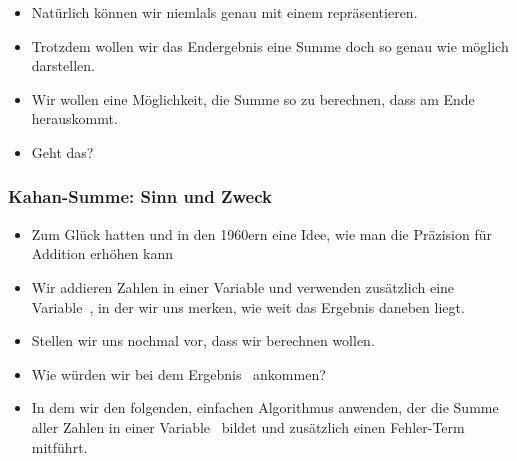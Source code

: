 \documentclass[aspectratio=169,mathserif,notheorems]{beamer}%
\begin{document}
\begin{frame}[t]
{{\begin{itemize}
{}%
%
%
%
%
%
%
%
\item<32-> Natürlich können wir  niemlals genau mit einem  repräsentieren.%
%
\item<33-> Trotzdem wollen wir das Endergebnis eine Summe doch so genau wie möglich darstellen.%
%
\item<34-> Wir wollen eine Möglichkeit, die Summe  so zu berechnen, dass am Ende  herauskommt.%
%
\item<35-> Geht das?%
\end{itemize}%
}}%
%
%
%
\end{frame}%
%
\begin{frame}%
\frametitle{Kahan-Summe: Sinn und Zweck}%
\begin{itemize}%
%
\item Zum Glück hatten \citeauthor{K1965PFRORTE} und \citeauthor{B1968NSIMA} in den 1960ern eine Idee, wie man die Präzision für Addition erhöhen kann%
%
\item<2-> Wir addieren Zahlen in einer Variable  und verwenden zusätzlich eine Variable~, in der wir uns merken, wie weit das Ergebnis daneben liegt.%
%
\item<3-> Stellen wir uns nochmal vor, dass wir  berechnen wollen.%
%
\item<4-> Wie würden wir bei dem Ergebnis~ ankommen?
%
\item<5-> In dem wir den folgenden, einfachen Algorithmus anwenden, der die Summe aller Zahlen in einer Variable~ bildet und zusätzlich einen Fehler-Term~ mitführt.
\end{itemize}%
\end{frame}%
%
\end{document}
